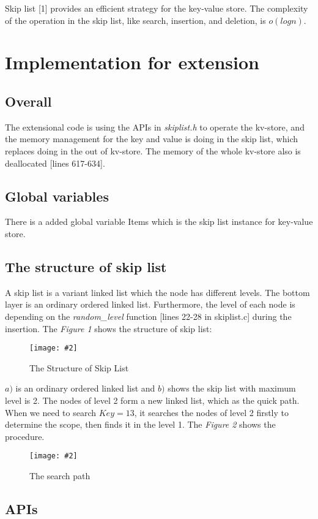 \documentclass[10pt, a4paper]{article}
\newcommand{\figuremacro}[5]{
    \begin{figure}[#1]
        \centering
        \texttt{[image: \#2]}
        \caption[#3]{\textbf{#3}#4}
        \label{fig:#2}
    \end{figure}
}
\begin{document}
Skip list [1] provides an efficient strategy for the key-value store. The complexity of the operation in the skip list, like search, insertion, and deletion, is $o(logn)$.


\section{Implementation for extension}

\subsection{Overall}

The extensional code is using the APIs in \textit{skiplist.h} to operate the kv-store, and the memory management for the key and value is doing in the skip list, which replaces doing in the out of kv-store. The memory of the whole kv-store also is deallocated [lines 617-634].

\subsection{Global variables}

There is a added global variable Items which is the skip list instance for key-value store.


\subsection{The structure of skip list}

A skip list is a variant linked list which the node has different levels. The bottom layer is an ordinary ordered linked list. Furthermore, the level of each node is depending on the \textit{random\_level} function [lines 22-28 in skiplist.c] during the insertion. The \textit{Figure 1} shows the structure of skip list:

\figuremacro{h}{figure01}{}{The Structure of Skip List}{1.0}

$a)$ is an ordinary ordered linked list and $b)$ shows the skip list with maximum level is 2. The nodes of level 2 form a new linked list, which as the quick path. When we need to search $Key=13$, it searches the nodes of level 2 firstly to determine the scope, then finds it in the level 1. The \textit{Figure 2} shows the procedure.

\figuremacro{h}{figure02}{}{The search path}{1.0}


\subsection{APIs}
\end{document}
